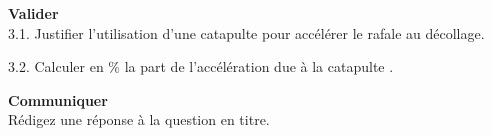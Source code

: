 \documentclass[11pt,a4paper]{article}
\newcommand{\cadreblanc}[1]{%
\medskip\framebox[\linewidth][c]{%
\rule{0mm}{#1mm}}\par
\medskip}
\begin{document}
\textbf{ Valider} \\

3.1. Justifier l'utilisation d'une catapulte pour accélérer le rafale au décollage. 

\vspace{5mm}
\dotfill 

\vspace{5mm}

3.2. Calculer en \% la part de l'accélération due à la catapulte . 

\cadreblanc{10}

\vspace{5mm}

\textbf{ Communiquer} \\

Rédigez une réponse à la question en titre. 

\cadreblanc{15}



\vfill 
\end{document}
